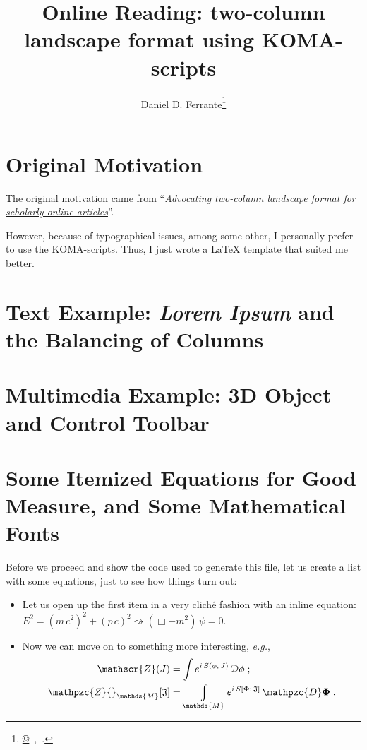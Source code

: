 \documentclass[       %
  paper=279mm:216mm,  %
  fontsize=12pt,      %
  twoside,
  pagesize=auto,           %
  version=last,
  numbers=noendperiod,%
  captions=nooneline, %
  DIV=calc
]{scrartcl}
\title{Online Reading: two-column landscape format using KOMA-scripts}
\author{\sffamily Daniel D. Ferrante\footnote{
  \href{http://www.het.brown.edu/people/danieldf/}{\copyright}\; \semver\,,\;
  \href{http://creativecommons.org/licenses/by-nc-sa/3.0/}{\ccbyncsa}\,.}}
\date{\sffamily\todayiso}
\begin{document}
%
\maketitle
%
\begin{multicols}{2}
  \tableofcontents


  \section{Original Motivation}
  The original motivation came from
  ``\href{http://scholardox.wordpress.com/2013/05/29/two-column-landscape-should-be-the-standard-format-of-scholarly-online-articles/}
    {\emph{Advocating two-column landscape format for scholarly online articles}}''.
    
  However, because of typographical issues, among some other, I personally prefer
  to use the \href{http://www.ctan.org/pkg/koma-script}{KOMA-scripts}. Thus, I
  just wrote a \LaTeX\/ template that suited me better.


  \section{Text Example: \textit{Lorem Ipsum} and the Balancing of Columns}

  \lipsum
  

  \section{Multimedia Example: 3D Object and Control Toolbar}

  

  \section{Some Itemized Equations for Good Measure, and Some Mathematical Fonts}

  Before we proceed and show the code used to generate this file, let us create
  a list with some equations, just to see how things turn out:
  \begin{itemize}
  \item Let us open up the first item in a very cliché fashion with an inline
    equation: $E^2 = (m\, c^2)^2 + (p\, c)^2 \rightsquigarrow (\Box + m^2)\, \psi = 0$.
  \item Now we can move on to something more interesting, \emph{e.g.},
    \begin{align*}
      \mathscr{Z}(J) &= \int e^{i\, S(\phi,\, J)}\, \mathcal{D}\phi \;;\\
      \mathpzc{Z}{}_{\mathds{M}}[\mathfrak{J}]&= \varint_{\mathds{M}}
        e^{i\, S[\boldsymbol{\Phi};\, \mathfrak{J}]}\, \mathpzc{D}\boldsymbol{\Phi}\;.
    \end{align*}
  \end{itemize}


\end{multicols}
\end{document}
